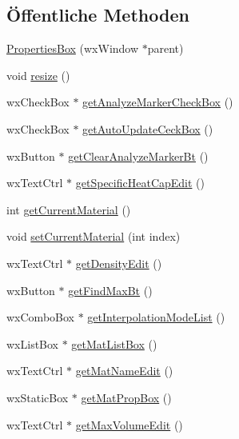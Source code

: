 \subsection*{Öffentliche Methoden}
\begin{DoxyCompactItemize}
\item 
\hyperlink{classPropertiesBox_a9218399db23aa9a4200ccf60edd74f5a}{Properties\-Box} (wx\-Window $\ast$parent)
\item 
void \hyperlink{classPropertiesBox_adce6c28da4adced9bb98937c5cb85de0}{resize} ()
\item 
wx\-Check\-Box $\ast$ \hyperlink{classPropertiesBox_a13b9ce3aa1761689ff4be9fadeab2d87}{get\-Analyze\-Marker\-Check\-Box} ()
\item 
wx\-Check\-Box $\ast$ \hyperlink{classPropertiesBox_a0def09e75b2c748b2bb8fb78369a422c}{get\-Auto\-Update\-Ceck\-Box} ()
\item 
wx\-Button $\ast$ \hyperlink{classPropertiesBox_ad788ed8a06f21958e3c6ea043a162918}{get\-Clear\-Analyze\-Marker\-Bt} ()
\item 
wx\-Text\-Ctrl $\ast$ \hyperlink{classPropertiesBox_a84eb37f7bc965f3eecb638d63fa4af48}{get\-Specific\-Heat\-Cap\-Edit} ()
\item 
int \hyperlink{classPropertiesBox_aa564b32c992a780af80378ec66b3377f}{get\-Current\-Material} ()
\item 
void \hyperlink{classPropertiesBox_a995d6f6b8f068f4db6d6543f057d3fde}{set\-Current\-Material} (int index)
\item 
wx\-Text\-Ctrl $\ast$ \hyperlink{classPropertiesBox_a088fac7ebd80b9499a98ff3a1cc93a94}{get\-Density\-Edit} ()
\item 
wx\-Button $\ast$ \hyperlink{classPropertiesBox_a98fdcce60c8fc8d7fea0adca8d9fe7c3}{get\-Find\-Max\-Bt} ()
\item 
wx\-Combo\-Box $\ast$ \hyperlink{classPropertiesBox_a27b80b42d1ab9717538de23297c8a80c}{get\-Interpolation\-Mode\-List} ()
\item 
wx\-List\-Box $\ast$ \hyperlink{classPropertiesBox_a0fe27b9cfb280154821fda1f9eb6d59e}{get\-Mat\-List\-Box} ()
\item 
wx\-Text\-Ctrl $\ast$ \hyperlink{classPropertiesBox_a10c51038eb2219e6465d213200adcbd1}{get\-Mat\-Name\-Edit} ()
\item 
wx\-Static\-Box $\ast$ \hyperlink{classPropertiesBox_a152592fad06b248540565859e6747602}{get\-Mat\-Prop\-Box} ()
\item 
wx\-Text\-Ctrl $\ast$ \hyperlink{classPropertiesBox_ade5cd5f8ad6d86a777844ff00e199cf7}{get\-Max\-Volume\-Edit} ()

\end{DoxyCompactItemize}
